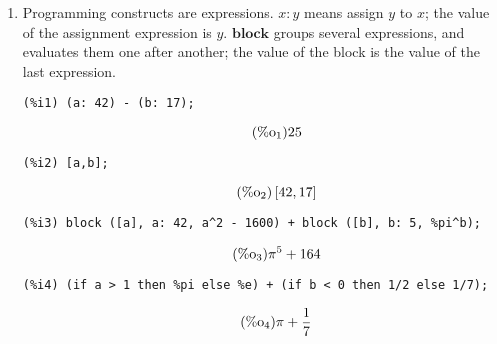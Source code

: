 \documentclass[12pt,leqno]{article}
\begin{document}
\begin{enumerate}
\begin{equation}
\begin{bmatrix}
  \left[\pi, 17\right] & a d-b c\\
  \begin{bmatrix}
  1 & a\\
  b & 7
\end{bmatrix}
 & e
\end{bmatrix}
\label{eq:doc-group1-code8-6-1}
\end{equation}
\begin{verbatim}
(%i7) M [2][1];
\end{verbatim}
\begin{equation}
\tag{$\mathop{\mathrm{\%o}_{7}}$}29
\label{eq:doc-group1-code8-7-1}
\end{equation}
\begin{verbatim}
(%i8) M2 [2][1];
\end{verbatim}
\begin{equation}
\tag{$\mathop{\mathrm{\%o}_{8}}$}\begin{bmatrix}
  1 & a\\
  b & 7
\end{bmatrix}
\label{eq:doc-group1-code8-8-1}
\end{equation}


\item Programming constructs are expressions.
$x : y$ means assign $y$ to $x$; the value of the assignment expression is $y$.
$\mathbf{block}$ groups several expressions, and evaluates them one after another;
the value of the block is the value of the last expression.
\begin{verbatim}
(%i1) (a: 42) - (b: 17);
\end{verbatim}
\begin{equation}
\tag{$\mathop{\mathrm{\%o}_{1}}$}25
\label{eq:doc-group1-code9-1-1}
\end{equation}
\begin{verbatim}
(%i2) [a,b];
\end{verbatim}
\begin{equation}
\tag{$\mathop{\mathrm{\%o}_{2}}$}\left[42, 17\right]
\label{eq:doc-group1-code9-2-1}
\end{equation}
\begin{verbatim}
(%i3) block ([a], a: 42, a^2 - 1600) + block ([b], b: 5, %pi^b);
\end{verbatim}
\begin{equation}
\tag{$\mathop{\mathrm{\%o}_{3}}$}{\pi}^{5}+164
\label{eq:doc-group1-code9-3-1}
\end{equation}
\begin{verbatim}
(%i4) (if a > 1 then %pi else %e) + (if b < 0 then 1/2 else 1/7);
\end{verbatim}
\begin{equation}
\tag{$\mathop{\mathrm{\%o}_{4}}$}\pi+\frac{1}{7}
\label{eq:doc-group1-code9-4-1}
\end{equation}



\end{enumerate}
\end{document}
